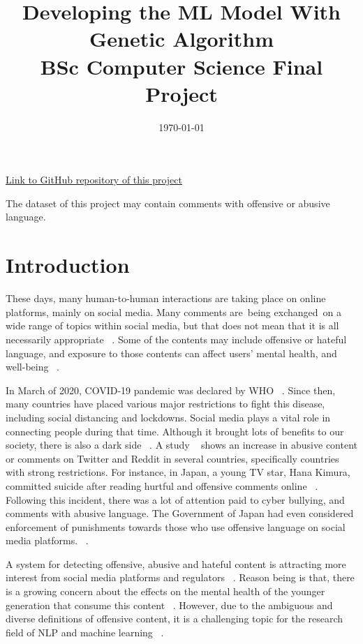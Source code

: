 \documentclass[11pt, natbib=false]{article}
\date{\today}
\title{%
  Developing the ML Model With Genetic Algorithm \\
  \large BSc Computer Science Final Project
}
\begin{document}
\maketitle
\href{https://github.com/hayacon/cs_final_project}{Link to GitHub repository of this project}

The dataset of this project may contain comments with offensive or abusive language.
\section{Introduction}
These days, many human-to-human interactions are taking place on online platforms, mainly on social media.
Many comments are being exchanged on a wide range of topics within social media, but that does not mean that it is all necessarily appropriate ~\cite{hada2021ruddit}.
Some of the contents may include offensive or hateful language, and exposure to those contents can affect users’ mental health, and well-being ~\cite{hada2021ruddit}.

In March of 2020, COVID-19 pandemic was declared by WHO ~\cite{whoCovid}.
Since then, many countries have placed various major restrictions to fight this disease, including social distancing and lockdowns. Social media plays a vital role in connecting people during that time. Although it brought lots of benefits to our society, there is also a dark side ~\cite{liu2021covid}.
A study ~\cite{babvey2021using} shows an increase in abusive content or comments on Twitter and Reddit in several countries, specifically countries with strong restrictions.
For instance, in Japan, a young TV star, Hana Kimura, committed suicide after reading hurtful and offensive comments online ~\cite{HanaK}.
Following this incident, there was a lot of attention paid to cyber bullying, and comments with abusive language. The Government of Japan had even considered enforcement of punishments towards those who use offensive language on social media platforms. ~\cite{JpGov}.


A system for detecting offensive, abusive and hateful content is attracting more interest from social media platforms and regulators ~\cite{vidgen2019challenges}.
Reason being is that, there is a growing concern about the effects on the mental health of the younger generation that consume this content ~\cite{babvey2021using}.
However, due to the ambiguous and diverse definitions of offensive content, it is a challenging topic for the research field of NLP and machine learning ~\cite{vidgen2019challenges}.
\end{document}
